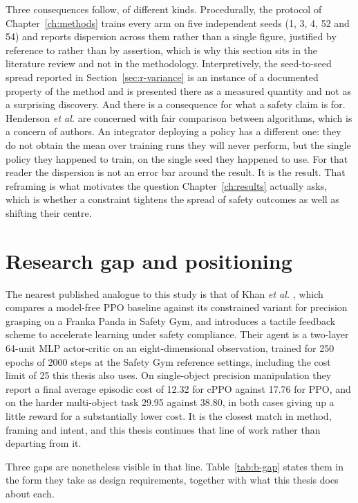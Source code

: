 Three consequences follow, of different kinds. Procedurally, the protocol of
Chapter~\ref{ch:methods} trains every arm on five independent seeds (1, 3, 4, 52 and 54) and
reports dispersion across them rather than a single figure, justified by reference to
\cite{henderson2018matters} rather than by assertion, which is why this section sits in the
literature review and not in the methodology. Interpretively, the seed-to-seed spread reported in
Section~\ref{sec:r-variance} is an instance of a documented property of the method and is
presented there as a measured quantity and not as a surprising discovery. And there is a
consequence for what a safety claim is for. Henderson \emph{et al.} are concerned with fair
comparison between algorithms, which is a concern of authors. An integrator deploying a policy
has a different one: they do not obtain the mean over training runs they will never perform, but
the single policy they happened to train, on the single seed they happened to use. For that
reader the dispersion is not an error bar around the result. It is the result. That reframing is
what motivates the question Chapter~\ref{ch:results} actually asks, which is whether a constraint
tightens the spread of safety outcomes as well as shifting their centre.

\section{Research gap and positioning}\label{sec:b-gap}

The nearest published analogue to this study is that of Khan \emph{et al.}
\cite{khan2026rl_precision_grasping}, which compares a model-free PPO baseline against its
constrained variant for precision grasping on a Franka Panda in Safety Gym, and introduces a
tactile feedback scheme to accelerate learning under safety compliance. Their agent is a
two-layer 64-unit MLP actor-critic on an eight-dimensional observation, trained for 250 epochs of
2000 steps at the Safety Gym reference settings, including the cost limit of 25 this thesis also
uses. On single-object precision manipulation they report a final average episodic cost of 12.32
for cPPO against 17.76 for PPO, and on the harder multi-object task 29.95 against 38.80, in both
cases giving up a little reward for a substantially lower cost. It is the closest match in
method, framing and intent, and this thesis continues that line of work rather than departing
from it.

Three gaps are nonetheless visible in that line. Table~\ref{tab:b-gap} states them in the form
they take as design requirements, together with what this thesis does about each.

